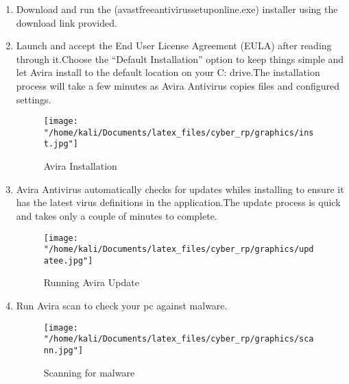\begin{enumerate}
\begin{figure}
	\end{figure}
	\item
	Download and run the (avastfreeantivirussetuponline.exe)  installer using the download link provided.
	\item
	Launch and accept the End User License Agreement (EULA)  after reading through it.Choose the “Default Installation” option to keep things simple and let Avira install to the default location on your C: drive.The installation process will take a few minutes as Avira Antivirus copies files and configured settings.\\
		\begin{figure}[H]
		\centering
		\texttt{[image: "/home/kali/Documents/latex\_files/cyber\_rp/graphics/inst.jpg"]} \\
		\caption{Avira Installation}
	\end{figure}
	\item
	Avira Antivirus automatically checks for updates whiles installing to ensure it has the latest virus definitions in the application.The update process is quick and takes only a couple of minutes to complete.
	\begin{figure}[H]
		\centering
		\texttt{[image: "/home/kali/Documents/latex\_files/cyber\_rp/graphics/updatee.jpg"]} \\
		\caption{Running Avira Update}
	\end{figure}
	\item
	Run Avira scan to check your pc against malware.
	\begin{figure}[H]
		\centering
		\texttt{[image: "/home/kali/Documents/latex\_files/cyber\_rp/graphics/scann.jpg"]} \\
		\caption{Scanning for malware}
	\end{figure}

\end{enumerate}